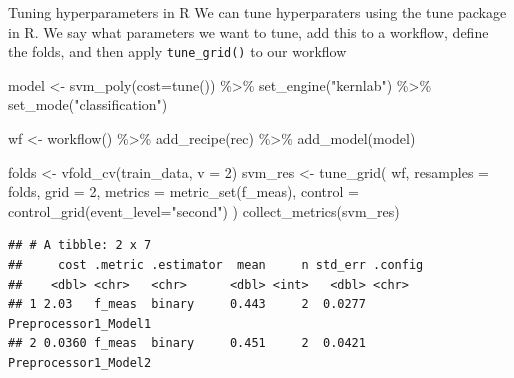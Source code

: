 \documentclass[
  10pt,
  ignorenonframetext,
  aspectratio=169]{beamer}
\newenvironment{Shaded}{\begin{snugshade}}{\end{snugshade}}
\newcommand{\AttributeTok}[1]{\textcolor[rgb]{0.80,0.80,0.80}{#1}}
\newcommand{\DecValTok}[1]{\textcolor[rgb]{0.86,0.86,0.80}{#1}}
\newcommand{\FunctionTok}[1]{\textcolor[rgb]{0.94,0.94,0.56}{#1}}
\newcommand{\NormalTok}[1]{\textcolor[rgb]{0.80,0.80,0.80}{#1}}
\newcommand{\OtherTok}[1]{\textcolor[rgb]{0.94,0.94,0.56}{#1}}
\newcommand{\SpecialCharTok}[1]{\textcolor[rgb]{0.86,0.64,0.64}{#1}}
\newcommand{\StringTok}[1]{\textcolor[rgb]{0.80,0.58,0.58}{#1}}
\begin{document}
\begin{frame}[fragile]{Tuning hyperparameters in R}
\protect\hypertarget{tuning-hyperparameters-in-r}{}
We can tune hyperparaters using the tune package in R. We say what
parameters we want to tune, add this to a workflow, define the folds,
and then apply \texttt{tune\_grid()} to our workflow

\medskip
\scriptsize

\begin{Shaded}
\begin{Highlighting}[]
\NormalTok{model }\OtherTok{\textless{}{-}} \FunctionTok{svm\_poly}\NormalTok{(}\AttributeTok{cost=}\FunctionTok{tune}\NormalTok{()) }\SpecialCharTok{\%\textgreater{}\%}
  \FunctionTok{set\_engine}\NormalTok{(}\StringTok{"kernlab"}\NormalTok{) }\SpecialCharTok{\%\textgreater{}\%}
  \FunctionTok{set\_mode}\NormalTok{(}\StringTok{"classification"}\NormalTok{)}

\NormalTok{wf }\OtherTok{\textless{}{-}} \FunctionTok{workflow}\NormalTok{() }\SpecialCharTok{\%\textgreater{}\%}
  \FunctionTok{add\_recipe}\NormalTok{(rec) }\SpecialCharTok{\%\textgreater{}\%}
  \FunctionTok{add\_model}\NormalTok{(model)}

\NormalTok{folds }\OtherTok{\textless{}{-}} \FunctionTok{vfold\_cv}\NormalTok{(train\_data, }\AttributeTok{v =} \DecValTok{2}\NormalTok{)}
\NormalTok{svm\_res }\OtherTok{\textless{}{-}} \FunctionTok{tune\_grid}\NormalTok{(}
\NormalTok{  wf, }\AttributeTok{resamples =}\NormalTok{ folds, }\AttributeTok{grid =} \DecValTok{2}\NormalTok{,}
  \AttributeTok{metrics =} \FunctionTok{metric\_set}\NormalTok{(f\_meas),}
  \AttributeTok{control =} \FunctionTok{control\_grid}\NormalTok{(}\AttributeTok{event\_level=}\StringTok{"second"}\NormalTok{)}
\NormalTok{  )}
\FunctionTok{collect\_metrics}\NormalTok{(svm\_res)}
\end{Highlighting}
\end{Shaded}

\begin{verbatim}
## # A tibble: 2 x 7
##     cost .metric .estimator  mean     n std_err .config             
##    <dbl> <chr>   <chr>      <dbl> <int>   <dbl> <chr>               
## 1 2.03   f_meas  binary     0.443     2  0.0277 Preprocessor1_Model1
## 2 0.0360 f_meas  binary     0.451     2  0.0421 Preprocessor1_Model2
\end{verbatim}
\end{frame}
\end{document}
